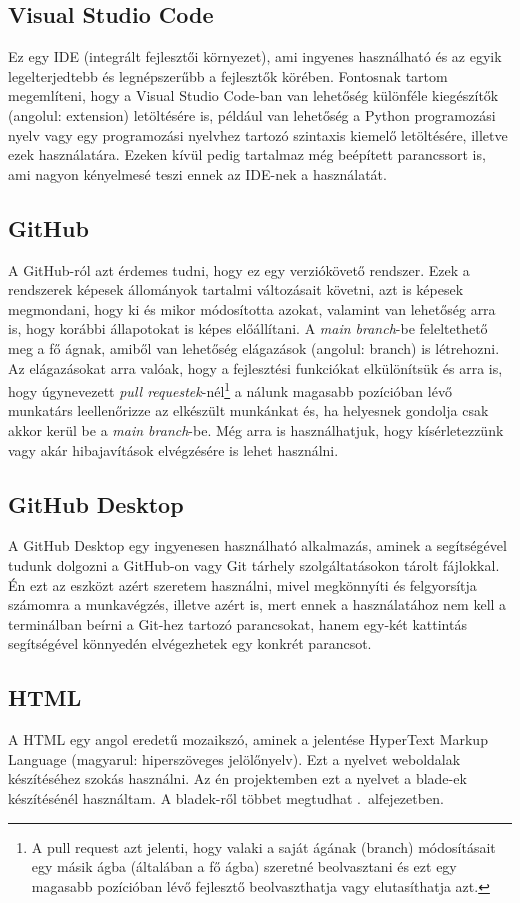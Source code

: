 \documentclass[]{thesis-ekf}
\theoremstyle{definition}
\theoremstyle{remark}
\begin{document}
	\subsection{Visual Studio Code}
		Ez egy IDE (integrált fejlesztői környezet), ami ingyenes használható és az egyik legelterjedtebb és legnépszerűbb a fejlesztők körében. Fontosnak tartom megemlíteni, hogy a Visual Studio Code-ban van lehetőség különféle kiegészítők (angolul: extension) letöltésére is, például van lehetőség a Python programozási nyelv vagy egy programozási nyelvhez tartozó szintaxis kiemelő letöltésére, illetve ezek használatára. Ezeken kívül pedig tartalmaz még beépített parancssort is, ami nagyon kényelmesé teszi ennek az IDE-nek a használatát. 
	\subsection{GitHub}
		A GitHub-ról azt érdemes tudni, hogy ez egy verziókövető rendszer. Ezek a rendszerek képesek állományok tartalmi változásait követni, azt is képesek megmondani, hogy ki és mikor módosította azokat, valamint van lehetőség arra is, hogy korábbi állapotokat is képes előállítani. A \emph{main branch}-be feleltethető meg a fő ágnak, amiből van lehetőség elágazások (angolul: branch) is létrehozni. Az elágazásokat arra valóak, hogy a fejlesztési funkciókat elkülönítsük és arra is, hogy úgynevezett \emph{pull requestek}-nél\footnote{A pull request azt jelenti, hogy valaki a saját ágának (branch) módosításait egy másik ágba (általában a fő ágba) szeretné beolvasztani és ezt egy magasabb pozícióban lévő fejlesztő beolvaszthatja vagy elutasíthatja azt.} a nálunk magasabb pozícióban lévő munkatárs leellenőrizze az elkészült munkánkat és, ha helyesnek gondolja csak akkor kerül be a \emph{main branch}-be. Még arra is használhatjuk, hogy kísérletezzünk vagy akár hibajavítások elvégzésére is lehet használni.
	\subsection{GitHub Desktop}
		A GitHub Desktop egy ingyenesen használható alkalmazás, aminek a segítségével tudunk dolgozni a GitHub-on vagy Git tárhely szolgáltatásokon tárolt fájlokkal. Én ezt az eszközt azért szeretem használni, mivel megkönnyíti és felgyorsítja számomra a munkavégzés, illetve azért is, mert ennek a használatához nem kell a terminálban beírni a Git-hez tartozó parancsokat, hanem egy-két kattintás segítségével könnyedén elvégezhetek egy konkrét parancsot. \cite{GitHubDesktop}
	\subsection{HTML}
		A HTML egy angol eredetű mozaikszó, aminek a jelentése HyperText Markup Language (magyarul: hiperszöveges jelölőnyelv). Ezt a nyelvet weboldalak készítéséhez szokás használni. Az én projektemben ezt a nyelvet a blade-ek készítésénél használtam. A bladek-ről többet megtudhat .~alfejezetben.   
\end{document}
